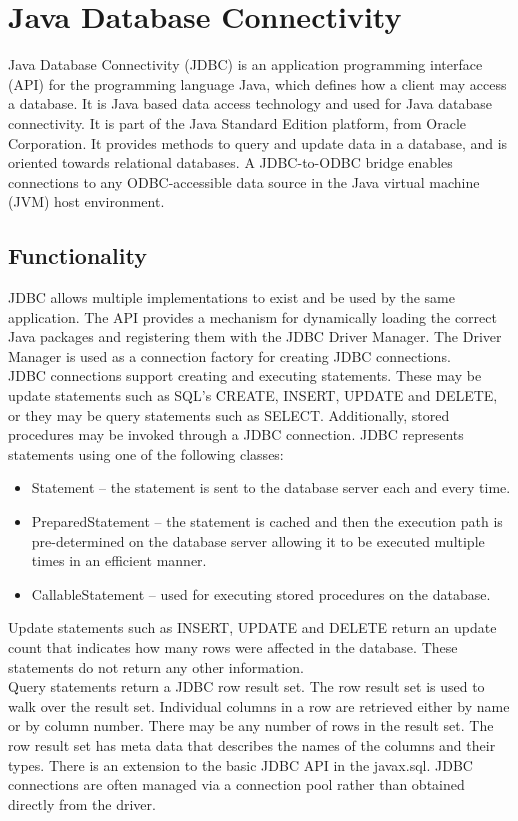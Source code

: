 \chapter{Java Database Connectivity}
\thispagestyle{fancy}
Java Database Connectivity (JDBC) is an application programming interface (API) for the programming language Java, which defines how a client may access a database. It is Java based data access technology and used for Java database connectivity. It is part of the Java Standard Edition platform, from Oracle Corporation. It provides methods to query and
update data in a database, and is oriented towards relational databases. A JDBC-to-ODBC bridge enables connections to any ODBC-accessible data source in the Java virtual machine (JVM) host environment.

\section{Functionality}
JDBC allows multiple implementations to exist and be used by the same application. The API provides a mechanism for dynamically loading the correct Java packages and registering them with the JDBC Driver Manager. The Driver Manager is used as a connection factory for creating JDBC connections.\\
JDBC connections support creating and executing statements. These may be update statements such as SQL's CREATE, INSERT, UPDATE and DELETE, or they may be query statements such as SELECT. Additionally, stored procedures may be invoked through a JDBC connection. JDBC represents statements using one of the following classes:
\begin{itemize}
	\item Statement – the statement is sent to the database server each and every time.
	\item PreparedStatement – the statement is cached and then the execution path is pre-determined on the database server allowing it to be executed multiple times in an efficient manner.
	\item CallableStatement – used for executing stored procedures on the database.
\end{itemize}
Update statements such as INSERT, UPDATE and DELETE return an update count that indicates how many rows were affected in the database. These statements do not return any other information.\\
Query statements return a JDBC row result set. The row result set is used to walk over the result set. Individual columns in a row are retrieved either by name or by column number. There may be any number of rows in the result set. The row result set has meta data that describes the names of the columns and their types. There is an extension to the basic JDBC
API in the javax.sql. JDBC connections are often managed via a connection pool rather than obtained directly from the driver.

